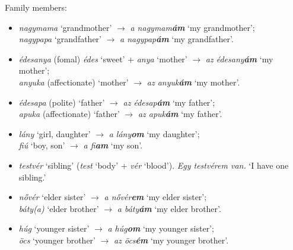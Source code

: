 \documentclass[a4paper,11pt]{article}
\begin{document}
\noindent Family members:
\begin{itemize}

  \item \emph{nagymama} `grandmother' $\rightarrow$ \emph{a
  nagymam\textbf{ám}} `my grandmother'; \\ \emph{nagypapa}
    `grandfather' $\rightarrow$ \emph{a nagypap\textbf{ám}} `my
    grandfather'.

  \item \emph{édesanya} (fomal) \emph{édes} `sweet' + \emph{anya}
    `mother' $\rightarrow$ \emph{az édesany\textbf{ám}} `my
    mother';\\ \emph{anyuka} (affectionate) `mother' $\rightarrow$
    \emph{az anyuk\textbf{ám}} `my mother'.

  \item \emph{édesapa} (polite) `father' $\rightarrow$ \emph{az
  édesap\textbf{ám}} `my father'; \\ \emph{apuka} (affectionate)
    `father' $\rightarrow$ \emph{az apuk\textbf{ám}} `my father'.

  \item \emph{lány} `girl, daughter' $\rightarrow$ \emph{a
  lány\textbf{om}} `my daughter'; \\ \emph{fiú} `boy, son' $\rightarrow$
    \emph{a fi\textbf{am}} `my son'.

  \item \emph{testvér} `sibling' (\emph{test} `body' + \emph{vér}
    `blood'). \emph{Egy testvérem van.} `I have one sibling.'

  \item \emph{nővér} `elder sister' $\rightarrow$ \emph{a
  nővér\textbf{em}} `my elder sister'; \\ \emph{báty(a)} `elder
    brother' $\rightarrow$ \emph{a báty\textbf{ám}} `my elder
    brother'.

  \item \emph{húg} `younger sister' $\rightarrow$ \emph{a
  húg\textbf{om}} `my younger sister'; \\ \emph{öcs} `younger brother'
    $\rightarrow$ \emph{az öcs\textbf{ém}} `my younger brother'.

\end{itemize}
\end{document}
